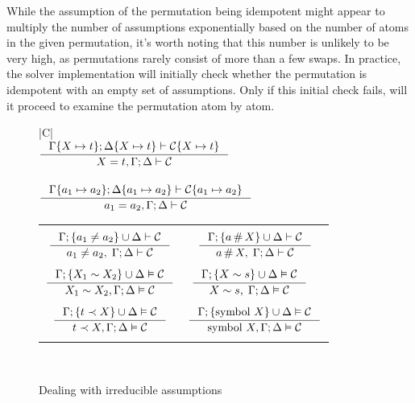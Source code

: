 \documentclass[english, mgr]{iithesis}
\newcommand{\solverRule}{\vdash}
\newcommand{\scbrk}[2]{\myatop{\textsc{#1}}{\textsc{#2}}}
\begin{document}
While the assumption of the permutation being idempotent might appear to multiply the number of assumptions exponentially based on the number of atoms in the given permutation,
it's worth noting that this number is unlikely to be very high, as permutations rarely consist of more than a few swaps.
In practice, the solver implementation will initially check whether the permutation is idempotent with an empty set of assumptions.
Only if this initial check fails, will it proceed to examine the permutation atom by atom.

\begin{figure}[hbtp]
  \centering
  \begin{tabularx}{\textwidth}{|C|}
      \hline \\ $
      \inference{
        \cEnv\subst{\termv}{\term} ; \icEnv\subst{\termv}{\term}
          \solverRule \sconstr\subst{\termv}{\term}
      }{
        \termv = \term, \cEnv ; \icEnv \solverRule \sconstr
      }$ \\ \\
      $
      \inference{
        \cEnv \subst{\atomv_1}{\atomv_2}; \icEnv\subst{\atomv_1}{\atomv_2}
          \solverRule \sconstr\subst{\atomv_1}{\atomv_2}
      }{
        \atomv_1 \ceq \atomv_2, \cEnv ; \icEnv \solverRule \sconstr
      }$ \\
    \begin{tabular}{cc}
    & \\ $
    \inference{
      \cEnv ; \{\atomv_1 \cneq \atomv_2\} \cup \icEnv \solverRule \sconstr
    }{
      \atomv_1 \cneq \atomv_2, \; \cEnv ; \icEnv \solverRule \sconstr
    }
    $ & $
    \inference{
      \cEnv ; \{\atomv \cfresh \termv\} \cup \icEnv \solverRule \sconstr
    }{
      \atomv \cfresh \termv, \; \cEnv ; \icEnv \solverRule \sconstr
    }
    $ \\ & \\ $
    \inference{
      \cEnv ; \{\termv_1 \csheq \termv_2\} \cup \icEnv \vDash \sconstr
    }{
      \termv_1 \csheq \termv_2, \cEnv ; \icEnv \vDash \sconstr
    }
    $ & $
    \inference{
      \cEnv ; \{\termv \csheq \shape\} \cup \icEnv \vDash \sconstr
    }{
      \termv \csheq \shape,\; \cEnv ; \icEnv \vDash \sconstr
    }
    \quad
    $ \\ & \\ $
    \inference{
      \cEnv ; \{\term \cshlt \termv\} \cup \icEnv \vDash \sconstr
    }{
      \term \cshlt \termv, \cEnv ; \icEnv \vDash \sconstr
    }
    $ & $
    \inference{
      \cEnv ; \{\csymb \termv\} \cup \icEnv \vDash \sconstr
    }{
      \csymb \termv, \cEnv ; \icEnv \vDash \sconstr
    }
    $ \\ & \\
    \end{tabular}
    \\ \hline
    \end{tabularx}
  \caption{Dealing with irreducible assumptions}
  \label{fig:assumption-equality-rules}
\end{figure}
\end{document}
